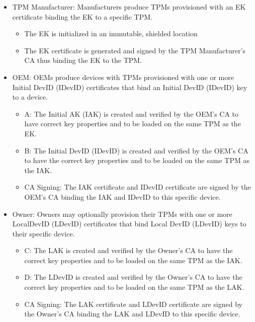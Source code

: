 \documentclass[runningheads]{llncs}
\begin{document}
\begin{itemize}[itemsep=0pt,parsep=0pt,partopsep=0pt]
\item \textsf{TPM Manufacturer}: Manufacturers produce TPMs provisioned with an
  EK certificate binding the EK to a specific TPM.
  \begin{itemize}[itemsep=0pt,parsep=0pt,partopsep=0pt]
  \item The EK is initialized in an immutable, shielded location
  \item The EK certificate is generated and signed by the TPM
    Manufacturer's CA thus binding the EK to the TPM.
  \end{itemize}
\item \textsf{OEM}: OEMs produce devices with TPMs provisioned with
  one or more Initial DevID (IDevID) certificates that bind an Initial
  DevID (IDevID) key to a device.
  \begin{itemize}[itemsep=0pt,parsep=0pt,partopsep=0pt]
  \item \textsf{A}: The Initial AK (IAK) is created and verified by
    the OEM's CA to have correct key properties and to be loaded on
    the same TPM as the EK.
  \item \textsf{B}: The Initial DevID (IDevID) is created and verified
    by the OEM's CA to have the correct key properties and to be
    loaded on the same TPM as the IAK.
  \item \textsf{CA Signing}: The IAK certificate and IDevID
    certificate are signed by the OEM's CA binding the IAK and IDevID
    to this specific device.
  \end{itemize}
\item \textsf{Owner}: Owners may optionally provision their TPMs with
  one or more LocalDevID (LDevID) certificates that bind Local DevID
  (LDevID) keys to their specific device.
  \begin{itemize}[itemsep=0pt,parsep=0pt,partopsep=0pt]
  \item \textsf{C}: The LAK is created and verified by the Owner's CA
    to have the correct key properties and to be loaded on the same
    TPM as the IAK.
  \item \textsf{D}: The LDevID is created and verified by the Owner's
    CA to have the correct key properties and to be loaded on the same
    TPM as the LAK.
  \item \textsf{CA Signing}: The LAK certificate and LDevID
    certificate are signed by the Owner's CA binding the LAK and
    LDevID to this specific device.
  \end{itemize}
\end{itemize}
\end{document}
